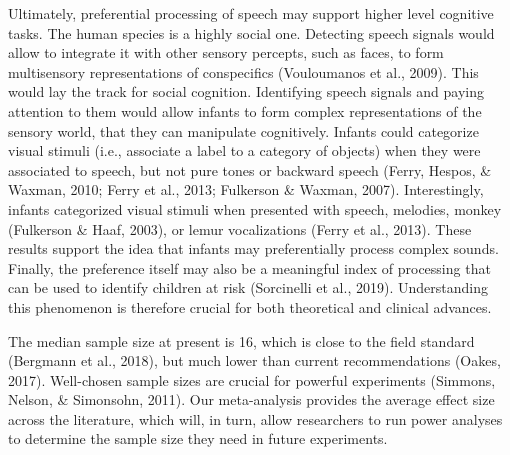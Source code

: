 \documentclass[man]{apa6}
\begin{document}
Ultimately, preferential processing of speech may support higher level
cognitive tasks. The human species is a highly social one. Detecting
speech signals would allow to integrate it with other sensory percepts,
such as faces, to form multisensory representations of conspecifics
(Vouloumanos et al., 2009). This would lay the track for social
cognition. Identifying speech signals and paying attention to them would
allow infants to form complex representations of the sensory world, that
they can manipulate cognitively. Infants could categorize visual stimuli
(i.e., associate a label to a category of objects) when they were
associated to speech, but not pure tones or backward speech (Ferry,
Hespos, \& Waxman, 2010; Ferry et al., 2013; Fulkerson \& Waxman, 2007).
Interestingly, infants categorized visual stimuli when presented with
speech, melodies, monkey (Fulkerson \& Haaf, 2003), or lemur
vocalizations (Ferry et al., 2013). These results support the idea that
infants may preferentially process complex sounds. Finally, the
preference itself may also be a meaningful index of processing that can
be used to identify children at risk (Sorcinelli et al., 2019).
Understanding this phenomenon is therefore crucial for both theoretical
and clinical advances.

The median sample size at present is 16, which is close to the field
standard (Bergmann et al., 2018), but much lower than current
recommendations (Oakes, 2017). Well-chosen sample sizes are crucial for
powerful experiments (Simmons, Nelson, \& Simonsohn, 2011). Our
meta-analysis provides the average effect size across the literature,
which will, in turn, allow researchers to run power analyses to
determine the sample size they need in future experiments.
\end{document}
